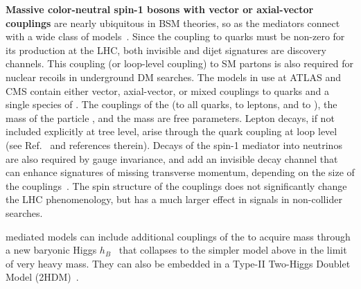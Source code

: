 \textbf{Massive color-neutral spin-1 bosons with vector or axial-vector couplings} are nearly ubiquitous in BSM theories, so \Zprime as the mediators connect with a wide class of models~\cite{Shoemaker:2011vi}.
Since the \Zprime coupling to quarks must be non-zero for its production at the LHC, both invisible and dijet signatures are discovery channels.
This coupling (or loop-level coupling) to SM partons is also required for nuclear recoils in underground DM searches.
The models in use at ATLAS and CMS contain either vector, axial-vector, or mixed couplings to quarks and a single species of \IP.
The couplings of the \Zprime (\gq to all quarks, \gl to leptons, and \gDM to \IP), the mass of the \IP particle \mdm, and the \Zprime mass \mmed are free parameters.
Lepton decays, if not included explicitly at tree level, arise through the quark coupling at loop level (see Ref.~\cite{Albert:2017onk} and references therein). Decays of the spin-1 mediator into neutrinos are also required by gauge invariance, and add an invisible decay channel that can enhance signatures of missing transverse momentum, depending on the size of the couplings~\cite{Albert:2017onk}. 
The spin structure of the \Zprime couplings does not significantly change the LHC phenomenology, but has a much larger effect in signals in non-collider searches. 


\Zprime mediated models can include additional couplings of the \Zprime to acquire mass through a new baryonic Higgs $h_B$~\cite{Berlin:2014cfa} that collapses to the simpler model above in the limit of very heavy \Zprime mass. 
They can also be embedded in a Type-II Two-Higgs Doublet Model (2HDM)~\cite{Berlin:2014cfa}.%

